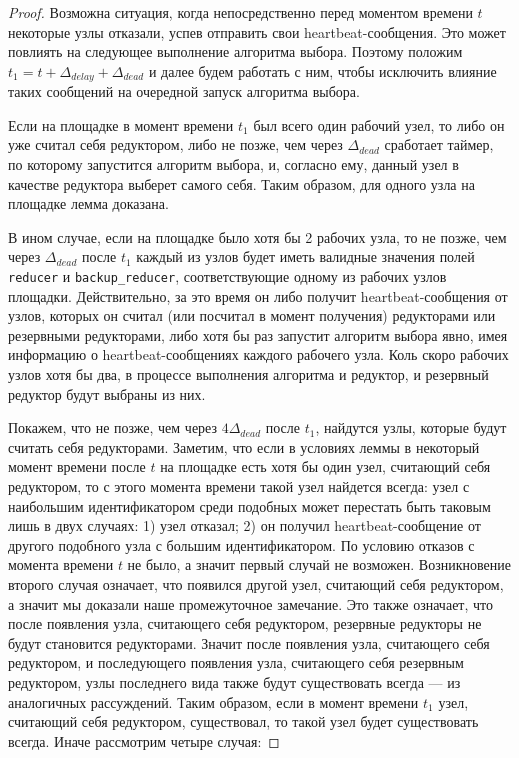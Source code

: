 \documentclass{article}
\theoremstyle{plain}
\theoremstyle{plain}
\theoremstyle{plain}
\theoremstyle{plain}
\theoremstyle{definition}
\theoremstyle{remark}
\theoremstyle{plain}
\begin{document}
\begin{proof}
    Возможна ситуация, когда непосредственно перед моментом времени $t$ некоторые узлы отказали, успев отправить свои heartbeat-сообщения. Это может повлиять на следующее выполнение алгоритма выбора. Поэтому положим $t_1 = t + \Delta_{delay} + \Delta_{dead}$ и далее будем работать с ним, чтобы исключить влияние таких сообщений на очередной запуск алгоритма выбора.

    Если на площадке в момент времени $t_1$ был всего один рабочий узел, то либо он уже считал себя редуктором, либо не позже, чем через $\Delta_{dead}$ сработает таймер, по которому запустится алгоритм выбора, и, согласно ему, данный узел в качестве редуктора выберет самого себя. Таким образом, для одного узла на площадке лемма доказана.
    
    В ином случае, если на площадке было хотя бы 2 рабочих узла, то не позже, чем через $\Delta_{dead}$ после $t_1$ каждый из узлов будет иметь валидные значения полей \texttt{reducer} и \texttt{backup\_reducer}, соответствующие одному из рабочих узлов площадки. Действительно, за это время он либо получит heartbeat-сообщения от узлов, которых он считал (или посчитал в момент получения) редукторами или резервными редукторами, либо хотя бы раз запустит алгоритм выбора явно, имея информацию о heartbeat-сообщениях каждого рабочего узла. Коль скоро рабочих узлов хотя бы два, в процессе выполнения алгоритма и редуктор, и резервный редуктор будут выбраны из них.
    
    Покажем, что не позже, чем через $4\Delta_{dead}$ после $t_1$, найдутся узлы, которые будут считать себя редукторами. Заметим, что если в условиях леммы в некоторый момент времени после $t$ на площадке есть хотя бы один узел, считающий себя редуктором, то с этого момента времени такой узел найдется всегда: узел с наибольшим идентификатором среди подобных может перестать быть таковым лишь в двух случаях: 1) узел отказал; 2) он получил heartbeat-сообщение от другого подобного узла с большим идентификатором. По условию отказов с момента времени $t$ не было, а значит первый случай не возможен. Возникновение второго случая означает, что появился другой узел, считающий себя редуктором, а значит мы доказали наше промежуточное замечание. Это также означает, что после появления узла, считающего себя редуктором, резервные редукторы не будут становится редукторами. Значит после появления узла, считающего себя редуктором, и последующего появления узла, считающего себя резервным редуктором, узлы последнего вида также будут существовать всегда --- из аналогичных рассуждений. Таким образом, если в момент времени $t_1$ узел, считающий себя редуктором, существовал, то такой узел будет существовать всегда. Иначе рассмотрим четыре случая:
    

\end{proof}
\end{document}

